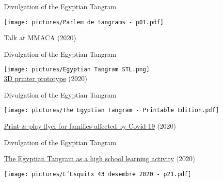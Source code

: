 \documentclass[14pt]{beamer}
\begin{document}
    \begin{frame}{Divulgation of the Egyptian Tangram}
        \begin{center}
            \colorbox{white}{\texttt{[image: pictures/Parlem de tangrams - p01.pdf]}} \\\bigskip

            \href{https://github.com/CarlosLunaMota/The-Egyptian-Tangram}{Talk at MMACA} (2020)
        \end{center}
    \end{frame}


    \begin{frame}{Divulgation of the Egyptian Tangram}
        \begin{center}
            \vspace{-3ex}
            {\texttt{[image: pictures/Egyptian Tangram STL.png]}} \\

            \href{https://github.com/CarlosLunaMota/The-Egyptian-Tangram}{3D printer prototype} (2020)
        \end{center}
    \end{frame}


    \begin{frame}{Divulgation of the Egyptian Tangram}
        \begin{center}
            \begin{minipage}{0.4\textwidth}
                \colorbox{white}{\texttt{[image: pictures/The Egyptian Tangram - Printable Edition.pdf]}}
            \end{minipage}\quad\begin{minipage}{0.5\textwidth}
                \href{https://github.com/CarlosLunaMota/The-Egyptian-Tangram}{Print-\&-play flyer for families affected by Covid-19}  (2020)
            \end{minipage}
        \end{center}
    \end{frame}


    \begin{frame}{Divulgation of the Egyptian Tangram}
        \begin{center}
            \begin{minipage}{0.5\textwidth}
                \href{http://www.sivilariera.cat/}{The Egyptian Tangram as a high school learning activity} (2020)
            \end{minipage}\quad\begin{minipage}{0.4\textwidth}
                \colorbox{white}{\texttt{[image: pictures/L'Esquitx 43 desembre 2020 - p21.pdf]}}
            \end{minipage}
        \end{center}
    \end{frame}
\end{document}
